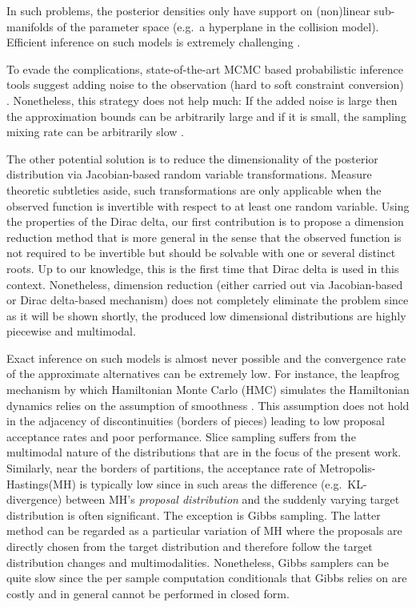 In such problems, the posterior densities only have support on (non)linear sub-manifolds of the parameter space (e.g.\ a hyperplane in the collision model). 
Efficient inference on such models is extremely challenging \cite{pennec2006intrinsic}. 

To evade the complications, state-of-the-art MCMC based probabilistic inference tools suggest adding noise to the observation (hard to soft constraint conversion) \cite{wood2014new}. 
Nonetheless, this strategy does not help much: If the added noise is large then the approximation bounds can be arbitrarily large and if it is small, the sampling mixing rate can be arbitrarily slow \cite{li2013dynamic,chin1987bayesian}. 
 
The other potential solution is to reduce the dimensionality of the posterior distribution via Jacobian-based random variable transformations. Measure theoretic subtleties aside, such transformations are only applicable when the observed function is invertible with respect to at least one random variable. Using the properties of the Dirac delta, our first contribution is to propose a dimension reduction method that is more general in the sense that the observed function is not required to be invertible but should be solvable with one or several distinct roots. Up to our knowledge, this is the first time that Dirac delta is used in this context.
Nonetheless, dimension reduction (either carried out via Jacobian-based or Dirac delta-based mechanism) does not completely eliminate the problem since as it will be shown shortly, the produced low dimensional distributions are highly piecewise and multimodal. 

Exact inference on such models is almost never possible and the convergence rate of the approximate alternatives can be extremely low.
For instance,
the leapfrog mechanism by which Hamiltonian Monte Carlo (HMC) simulates the Hamiltonian dynamics relies on the assumption of smoothness \cite{neal2011mcmc}.
This assumption does not hold 
 in the adjacency of discontinuities (borders of pieces) leading to low proposal acceptance rates and poor performance. 
Slice sampling suffers from the multimodal nature of the distributions that are in the focus of  the present work. Similarly, near the borders of partitions, the acceptance rate of Metropolis-Hastings(MH) is typically low since in such areas the difference (e.g.\ KL-divergence) between MH’s \emph{proposal distribution} and the suddenly varying target distribution is often significant.
The exception is Gibbs sampling. The latter method can be regarded as a particular variation of MH where the proposals are directly chosen from the target distribution and therefore follow the target distribution changes and multimodalities.
Nonetheless, Gibbs samplers can be quite slow since the per sample computation conditionals that Gibbs relies on are costly and in general cannot be performed in closed form.    

